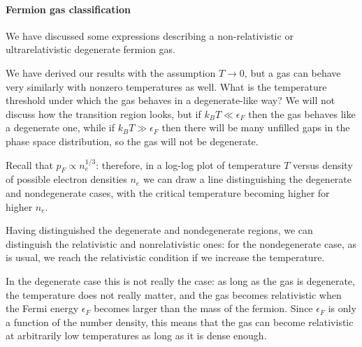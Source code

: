 \documentclass[main.tex]{subfiles}
\begin{document}
\paragraph{Fermion gas classification}

We have discussed some expressions describing a non-relativistic or ultrarelativistic degenerate fermion gas. 

We have derived our results with the assumption \(T \to 0\), but a gas can behave very similarly with nonzero temperatures as well. 
What is the temperature threshold under which the gas behaves in a degenerate-like way?
We will not discuss how the transition region looks, but if \(k_B T \ll \epsilon _F\) then the gas behaves like a degenerate one, while if \(k_B T \gg \epsilon _F\) then there will be many unfilled gaps in the phase space distribution, so the gas will not be degenerate. 

Recall that \(p_F \propto n_e^{1/3}\): therefore, in a log-log plot of temperature \(T\) versus density of possible electron densities \(n_e\) we can draw a line distinguishing the degenerate and nondegenerate cases, with the critical temperature becoming higher for higher \(n_e\).


Having distinguished the degenerate and nondegenerate regions, we can distinguish the relativistic and nonrelativistic ones: for the nondegenerate case, as is usual, we reach the relativistic condition if we increase the temperature. 

In the degenerate case this is not really the case: as long as the gas is degenerate, the temperature does not really matter, and the gas becomes relativistic when the Fermi energy \(\epsilon _F\) becomes larger than the mass of the fermion.
Since \(\epsilon _F\) is only a function of the number density, this means that the gas can become relativistic at arbitrarily low temperatures as long as it is dense enough.

\end{document}
